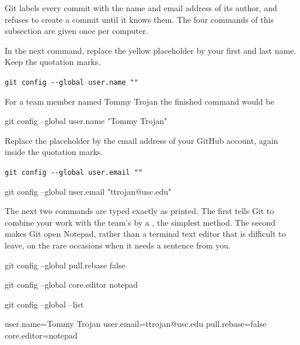 Git labels every commit with the name and email address of its author, and refuses to create a
commit until it knows them. The four commands of this subsection are given once per computer.

In the next command, replace the yellow placeholder by your first and last name. Keep the
quotation marks.
\begin{center}
\texttt{git config -{}-global user.name "}\texttt{"}
\end{center}
For a team member named Tommy Trojan the finished command would be
\begin{out}
git config --global user.name "Tommy Trojan"
\end{out}

Replace the placeholder by the email address of your GitHub account, again inside the quotation
marks.
\begin{center}
\texttt{git config -{}-global user.email "}\texttt{"}
\end{center}
\begin{out}
git config --global user.email "ttrojan@usc.edu"
\end{out}

The next two commands are typed exactly as printed. The first tells Git to combine your work
with the team's by a , the simplest method. The second makes Git open Notepad,
rather than a terminal text editor that is difficult to leave, on the rare occasions when it
needs a sentence from you.
\begin{ps}
git config --global pull.rebase false
\end{ps}
\begin{ps}
git config --global core.editor notepad
\end{ps}

\begin{ps}
git config --global --list
\end{ps}
\begin{out}
user.name=Tommy Trojan
user.email=ttrojan@usc.edu
pull.rebase=false
core.editor=notepad
\end{out}
